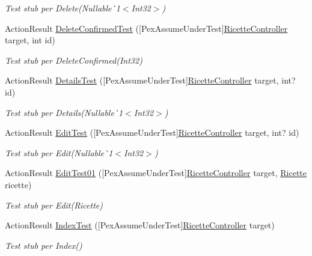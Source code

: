 \begin{DoxyCompactItemize}
\begin{DoxyCompactList}\small\item\em Test stub per Delete(Nullable\`{}1$<$Int32$>$)\end{DoxyCompactList}\item 
Action\+Result \mbox{\hyperlink{class_brew_day2_1_1_tests_1_1_ricette_controller_test_a4045be56144ee713bf32fb8a533da41f}{Delete\+Confirmed\+Test}} (\mbox{[}Pex\+Assume\+Under\+Test\mbox{]}\mbox{\hyperlink{class_brew_day2_1_1_controllers_1_1_ricette_controller}{Ricette\+Controller}} target, int id)
\begin{DoxyCompactList}\small\item\em Test stub per Delete\+Confirmed(\+Int32)\end{DoxyCompactList}\item 
Action\+Result \mbox{\hyperlink{class_brew_day2_1_1_tests_1_1_ricette_controller_test_a0da220a068c8ac875ca8fedd5f1f6a0f}{Details\+Test}} (\mbox{[}Pex\+Assume\+Under\+Test\mbox{]}\mbox{\hyperlink{class_brew_day2_1_1_controllers_1_1_ricette_controller}{Ricette\+Controller}} target, int? id)
\begin{DoxyCompactList}\small\item\em Test stub per Details(Nullable\`{}1$<$Int32$>$)\end{DoxyCompactList}\item 
Action\+Result \mbox{\hyperlink{class_brew_day2_1_1_tests_1_1_ricette_controller_test_a811ad94e3440cb5745a9b0ed6eba89cf}{Edit\+Test}} (\mbox{[}Pex\+Assume\+Under\+Test\mbox{]}\mbox{\hyperlink{class_brew_day2_1_1_controllers_1_1_ricette_controller}{Ricette\+Controller}} target, int? id)
\begin{DoxyCompactList}\small\item\em Test stub per Edit(Nullable\`{}1$<$Int32$>$)\end{DoxyCompactList}\item 
Action\+Result \mbox{\hyperlink{class_brew_day2_1_1_tests_1_1_ricette_controller_test_a5e7713a8b37b5151d7b68e8d96599794}{Edit\+Test01}} (\mbox{[}Pex\+Assume\+Under\+Test\mbox{]}\mbox{\hyperlink{class_brew_day2_1_1_controllers_1_1_ricette_controller}{Ricette\+Controller}} target, \mbox{\hyperlink{class_brew_day2_1_1_models_1_1_ricette}{Ricette}} ricette)
\begin{DoxyCompactList}\small\item\em Test stub per Edit(\+Ricette)\end{DoxyCompactList}\item 
Action\+Result \mbox{\hyperlink{class_brew_day2_1_1_tests_1_1_ricette_controller_test_a71521a23a9ae6ba83625575420814c26}{Index\+Test}} (\mbox{[}Pex\+Assume\+Under\+Test\mbox{]}\mbox{\hyperlink{class_brew_day2_1_1_controllers_1_1_ricette_controller}{Ricette\+Controller}} target)
\begin{DoxyCompactList}\small\item\em Test stub per Index()\end{DoxyCompactList}\end{DoxyCompactItemize}


